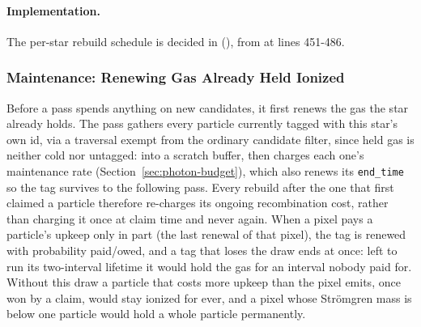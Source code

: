 \paragraph{Implementation.} The per-star rebuild schedule is decided in
(), from
 at lines 451-486.

\subsubsection{Maintenance: Renewing Gas Already Held Ionized}

Before a pass
spends anything on new candidates, it first renews the gas the star
already holds. The pass
gathers every particle currently tagged with this star's own id,
via a traversal exempt from the ordinary candidate filter,
since held gas is neither
cold nor untagged: into a scratch buffer, then charges each one's
maintenance rate (Section~\ref{sec:photon-budget}), which also renews
its \texttt{end\_time} so the tag survives to the following pass. Every
rebuild after the one that first claimed a particle therefore
re-charges its ongoing recombination cost, rather than charging it
once at claim time and never again. When a pixel pays a particle's
upkeep only in part (the last renewal of that pixel), the tag is
renewed with probability paid/owed, and a tag that loses the draw
ends at once: left to run its two-interval lifetime it would hold the
gas for an interval nobody paid for. Without this draw a particle that
costs more upkeep than the pixel emits, once won by a claim, would stay
ionized for ever, and a pixel whose Strömgren mass is below one
particle would hold a whole particle permanently.

